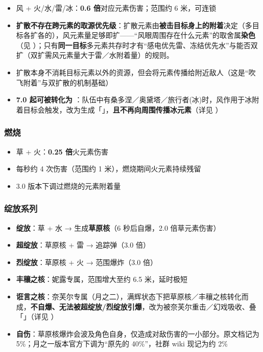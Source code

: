 \begin{itemize}
  \item {}风 + 火/水/雷/冰：\textbf{0.6 倍}对应元素伤害；范围约 6 米，可连锁
  \item \textbf{扩散不存在跨元素的取源优先级}：扩散元素由\textbf{被击目标身上的附着}决定（多目标各扩各的），风元素量足够即扩——“风眼周围存在什么元素”的取舍属\textbf{染色}（见 ）；只有\textbf{同一目标}多元素共存时才有“感电优先雷、冻结优先水”与能否双扩（双扩需风元素量大于雷／水附着量）的规则。
  \item 扩散本身不消耗目标元素以外的资源，但会将元素传播给附近敌人（这是“吹飞附着”与双扩散的机制基础）
  \item \textbf{7.0 起可被转化为 }：队伍中有桑多涅／奥黛塔／旅行者(冰)时，风作用于冰附着目标会触发，改为生成「」，\textbf{且不再向周围传播冰元素}（详见 ）
\end{itemize}

\subsubsection{燃烧}

\begin{itemize}
  \item {}草 + 火：\textbf{0.25 倍}火元素伤害
  \item 每秒约 4 次伤害（范围约 1 米），燃烧期间火元素持续残留
  \item 3.0 版本下调过燃烧的元素附着量
\end{itemize}

\subsubsection{绽放系列}

\begin{itemize}
  \item \textbf{绽放}：草 + 水 → 生成\textbf{草原核}（6 秒后自爆，2.0 倍草元素伤害）
  \item \textbf{超绽放}：草原核 + 雷 → 追踪弹（3.0 倍）
  \item \textbf{烈绽放}：草原核 + 火 → 范围爆炸（3.0 倍）
  \item \textbf{丰穰之核}：妮露专属，范围增大至约 6.5 米，延时极短
  \item \textbf{诳言之核}：奈芙尔专属（月之二），满辉状态下把草原核／丰穰之核转化而成，\textbf{不自爆、无法被超绽放/烈绽放引爆}，改为被奈芙尔重击／幻戏吸收、叠「」（详见 ）\srcmark
  \item \textbf{自伤}：草原核爆炸会波及角色自身，仅造成对敌伤害的一小部分。原文档记为 5\%；月之一版本官方下调为“原先的 40\%”，社群 wiki 现记为约 2\% 
\end{itemize}

